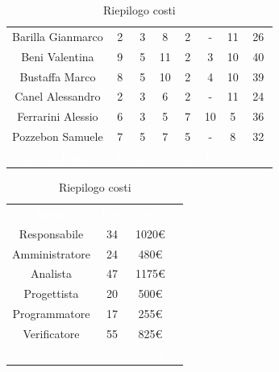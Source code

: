 \begin{table}[htb]
\begin{minipage}[c]{0.53\textwidth}
\begin{tabular}{>{\raggedright\arraybackslash}c|cccccc|c}
		\rowcolor[RGB]{216, 235, 171}
	    	Barilla Gianmarco & 2 & 3 & 8 & 2 & - & 11& 26		\\[4pt]
	    \rowcolor[RGB]{233, 245, 206}
	    	Beni Valentina & 9 & 5 & 11 & 2 & 3 & 10& 40			\\[4pt]
	    \rowcolor[RGB]{216, 235, 171}
	    	Bustaffa Marco & 8 & 5 & 10 & 2 & 4 & 10& 39			\\[4pt]
        \rowcolor[RGB]{233, 245, 206}
	    	Canel Alessandro & 2 & 3 & 6 & 2 & - & 11& 24 			\\[4pt]
        \rowcolor[RGB]{216, 235, 171}
	    	Ferrarini Alessio & 6 & 3 & 5 & 7 & 10 & 5& 36		\\[4pt]
        \rowcolor[RGB]{233, 245, 206}
	    	Pozzebon Samuele & 7 & 5 & 7 & 5 & - & 8& 32			\\[4pt]
		\rowcolor[RGB]{47, 106, 73}
			\textcolor{white}{Totale Ruolo} & \textcolor{white}{34} & \textcolor{white}{24} & \textcolor{white}{47} 
			& \textcolor{white}{20} & \textcolor{white}{17} & \textcolor{white}{55}
			& \textcolor{white}{197} \\[4pt]	
    \end{tabular}
    \caption{Riepilogo distribuzione oraria}
\end{minipage}
\hfill
\begin{minipage}{0.33\textwidth}
	\centering
	\begin{tabular}{cccc}
	    \rowcolor[RGB]{33, 73, 50}
	    \textcolor{white}{\textbf{Ruolo}} & \textcolor{white}{\textbf{Ore}} & \textcolor{white}{\textbf{Costo}}\\[4pt]
	    \rowcolor[RGB]{216, 235, 171}
	    Responsabile & 34 & 1020\euro\\[4pt]
	    \rowcolor[RGB]{233, 245, 206}
	    Amministratore & 24 & 480\euro\\[4pt]
        \rowcolor[RGB]{216, 235, 171}
	    Analista & 47 & 1175\euro\\[4pt]
	    \rowcolor[RGB]{233, 245, 206}
	    Progettista & 20 & 500\euro\\[4pt]
        \rowcolor[RGB]{216, 235, 171}
	    Programmatore & 17 & 255\euro\\[4pt]
	    \rowcolor[RGB]{233, 245, 206}
	    Verificatore & 55 & 825\euro\\[4pt]
		\rowcolor[RGB]{47, 106, 73}
			\textcolor{white}{Totale} & \textcolor{white}{197} & \textcolor{white}{4255\euro}\\[4pt]	
    \end{tabular}	
	\caption{Riepilogo costi}

\end{minipage}
\end{table}

